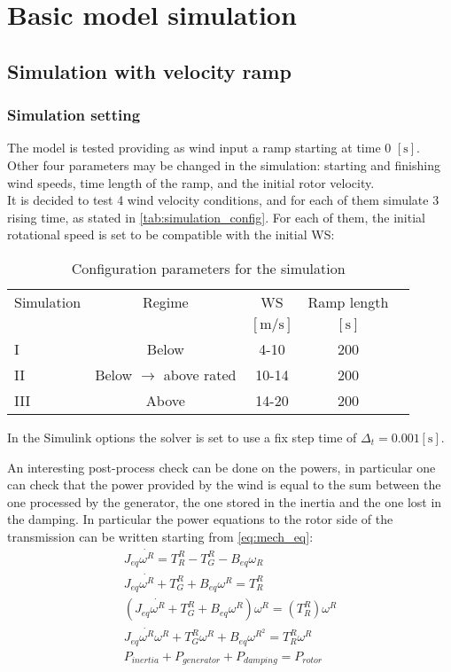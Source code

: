 \newpage
\section{Basic model simulation}\label{sec:c_basic_model_simulation}

\subsection{Simulation with velocity ramp}
\subsubsection{Simulation setting}
The model is tested providing as wind input a ramp starting at time 0 $\left[\si{\second}\right]$. Other four parameters may be changed in the simulation: starting and finishing wind speeds, time length of the ramp, and the initial rotor velocity.\\
It is decided to test 4 wind velocity conditions, and for each of them simulate 3 rising time, as stated in \autoref{tab:simulation_config}. For each of them, the initial rotational speed is set to be compatible with the initial \acrshort{WS}:

\begin{table}[htb]
    \caption{Configuration parameters for the simulation}
    \centering
    \begin{tabular}{lcccc}
    \toprule
      Simulation & Regime  & WS & Ramp length \\ 
       & & $\left[\si{\meter\per\second}\right]$ & $\left[\si{\second}\right]$ \\ \midrule       
       I & Below & 4-10 & 200  \\
       II & Below $\rightarrow$ above rated & 10-14 & 200 \\
       III & Above & 14-20 & 200  \\
       \bottomrule
    \end{tabular}
    \label{tab:simulation_config}
\end{table}

In the Simulink options the solver is set to use a fix step time of $\Delta_t=0.001 \left[\si{\second}\right]$.

An interesting post-process check can be done on the powers, in particular one can check that the power provided by the wind is equal to the sum between the one processed by the generator, the one stored in the inertia and the one lost in the damping. In particular the power equations to the rotor side of the transmission can be written starting from \ref{eq:mech_eq}:
\begin{gather}
    J_{eq}\dot{\omega^{R}} = T_R^R - T_G^R-B_{eq}\omega_R\\
    J_{eq}\dot{\omega^{R}} + T_G^R + B_{eq}\omega^R = T_R^R\\
    \left(J_{eq}\dot{\omega^{R}} + T_G^R + B_{eq}\omega^R\right)\omega^R = \left(T_R^R\right)\omega^R\\
    J_{eq}\dot{\omega^{R}}\omega^{R} + T_G^{R}\omega^{R} + B_{eq}\omega^{R^{2}} = T_R^{R}\omega^{R}\\
    P_{inertia} + P_{generator} + P_{damping} = P_{rotor} 
    \label{eq:power_balance}
\end{gather}

